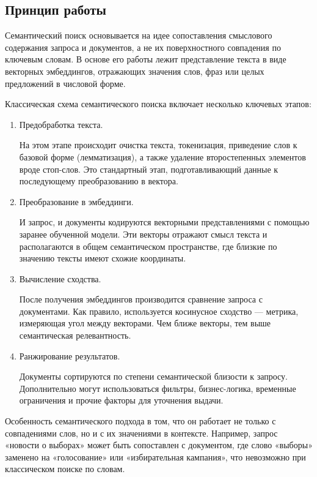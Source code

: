 \documentclass[coursework]{SCWorks}
\begin{document}
\subsection{Принцип работы}
Семантический поиск основывается на идее сопоставления смыслового содержания запроса и документов, а не их поверхностного совпадения по ключевым словам. В основе его работы лежит представление текста в виде векторных эмбеддингов, отражающих значения слов, фраз или целых предложений в числовой форме.

Классическая схема семантического поиска включает несколько ключевых этапов:
\begin{enumerate}
    \item Предобработка текста.
    
На этом этапе происходит очистка текста, токенизация, приведение слов к базовой форме (лемматизация), а также удаление второстепенных элементов вроде стоп-слов. Это стандартный этап, подготавливающий данные к последующему преобразованию в вектора.

    \item Преобразование в эмбеддинги.
    
И запрос, и документы кодируются векторными представлениями с помощью заранее обученной модели. Эти векторы отражают смысл текста и располагаются в общем семантическом пространстве, где близкие по значению тексты имеют схожие координаты.

    \item Вычисление сходства.
    
После получения эмбеддингов производится сравнение запроса с документами. Как правило, используется косинусное сходство — метрика, измеряющая угол между векторами. Чем ближе векторы, тем выше семантическая релевантность.

    \item Ранжирование результатов.
    
Документы сортируются по степени семантической близости к запросу. Дополнительно могут использоваться фильтры, бизнес-логика, временные ограничения и прочие факторы для уточнения выдачи.
\end{enumerate}

Особенность семантического подхода в том, что он работает не только с совпадениями слов, но и с их значениями в контексте. Например, запрос «новости о выборах» может быть сопоставлен с документом, где слово «выборы» заменено на «голосование» или «избирательная кампания», что невозможно при классическом поиске по словам.
\end{document}

